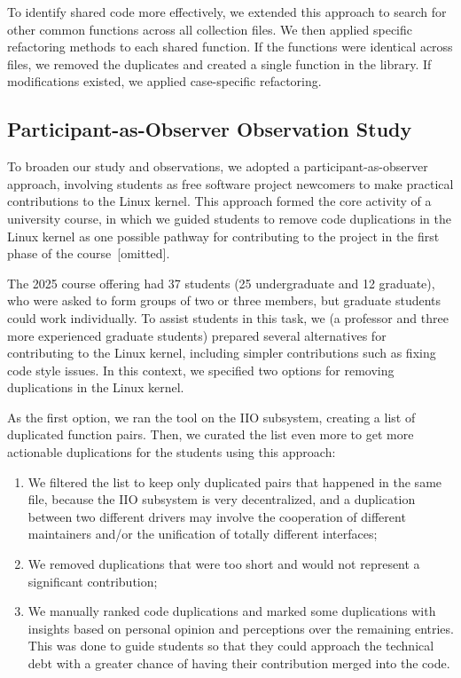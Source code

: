 \documentclass[sigconf]{acmart}
\begin{document}
To identify shared code more effectively, we extended this approach to search for other common functions across all collection files. We then applied specific refactoring methods to each shared function. If the functions were identical across files, we removed the duplicates and created a single function in the library. If modifications existed, we applied case-specific refactoring.

\subsection{Participant-as-Observer Observation Study}

To broaden our study and observations, we adopted a participant-as-observer approach, involving students as free software project newcomers to make practical contributions to the Linux kernel. This approach formed the core activity of a university course, in which we guided students to remove code duplications in the Linux kernel as one possible pathway for contributing to the project in the first phase of the course~[omitted].

The 2025 course offering had 37 students (25 undergraduate and 12 graduate), who were asked to form groups of two or three members, but graduate students could work individually. To assist students in this task, we (a professor and three more experienced graduate students) prepared several alternatives for contributing to the Linux kernel, including simpler contributions such as fixing code style issues. In this context, we specified two options for removing duplications in the Linux kernel.

As the first option, we ran the tool on the IIO subsystem, creating a list of duplicated function pairs. Then, we curated the list even more to get more actionable duplications for the students using this approach:

\begin{enumerate}
    \item We filtered the list to keep only duplicated pairs that happened in the same file, because the IIO subsystem is very decentralized, and a duplication between two different drivers may involve the cooperation of different maintainers and/or the unification of totally different interfaces;
    \item We removed duplications that were too short and would not represent a significant contribution;
    \item We manually ranked code duplications and marked some duplications with insights based on personal opinion and perceptions over the remaining entries. This was done to guide students so that they could approach the technical debt with a greater chance of having their contribution merged into the code.
\end{enumerate}
\end{document}
